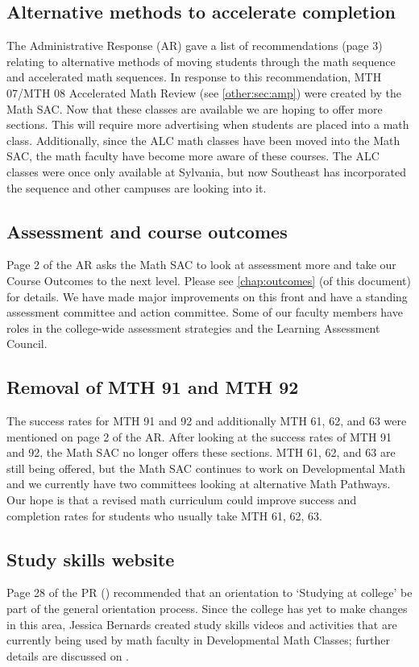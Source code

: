 \subsection{Alternative methods to accelerate completion}
The Administrative Response (AR) gave a list of recommendations (page 3) relating to alternative methods of moving students through the math sequence and accelerated math sequences.
In response to this recommendation, MTH 07/MTH 08 Accelerated Math Review (see \vref{other:sec:amp}) were created by the Math SAC.
Now that these classes are available we are hoping to offer more sections.
This will require more advertising when students are placed into a math class.
Additionally, since the ALC math classes have been moved into the Math SAC, the math faculty have become more aware of these courses.
The ALC classes were once only available at Sylvania, but now Southeast has incorporated the sequence and other campuses are looking into it.

\subsection{Assessment and course outcomes}
Page 2 of the AR asks the Math SAC to look at assessment more and take our Course Outcomes to the next level.
Please see \vref{chap:outcomes} (of this document) for details.
We have made major improvements on this front and have a standing assessment committee and action committee.
Some of our faculty members have roles in the college-wide assessment strategies and the Learning Assessment Council.

\subsection{Removal of MTH 91 and MTH 92}
The success rates for MTH 91 and 92 and additionally MTH 61, 62, and 63 were mentioned on page 2 of the AR.
After looking at the success rates of MTH 91 and 92, the Math SAC no longer offers these sections.
MTH 61, 62, and 63 are still being offered, but the Math SAC continues to work on Developmental Math and we currently have two committees looking at alternative Math Pathways.
Our hope is that a revised math curriculum could improve success and completion rates for students who usually take MTH 61, 62, 63.

\subsection{Study skills website}
Page 28 of the PR (\cite{mathprogramreview2003}) recommended that an orientation to `Studying at college' be part of the general orientation process.
Since the college has yet to make changes in this area, Jessica Bernards created study skills videos and activities that are currently being used by math faculty in Developmental Math Classes; further details are discussed on .

